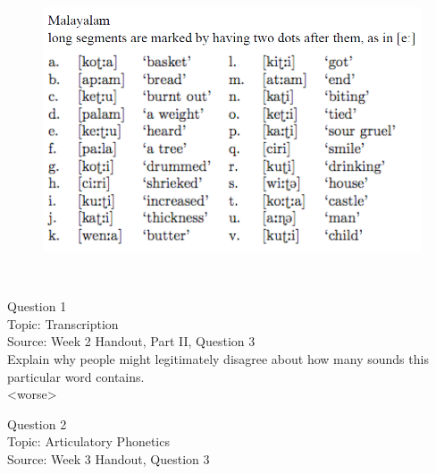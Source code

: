\documentclass[12pt]{article}
\begin{document}
\begin{figure}[H]
\includegraphics{../images/malayalam.png}
\end{figure}

\newpage

\begin{center}
\textbf{{\color{red}{\HUGE END OF EXAM}}}\\

\end{center}
\newpage

\begin{center}
\textbf{{\color{blue}{\HUGE START OF EXAM\\}}}

\textbf{{\color{blue}{\HUGE Student ID: 11661\\}}}

\textbf{{\color{blue}{\HUGE \\}}}

\end{center}
\newpage

{\large Question 1}\\

Topic: Transcription\\
Source: Week 2 Handout, Part II, Question 3\\

Explain why people might legitimately disagree about how many sounds this particular word contains.\\

<worse>


\newpage

{\large Question 2}\\

Topic: Articulatory Phonetics\\
Source: Week 3 Handout, Question 3\\
\end{document}
